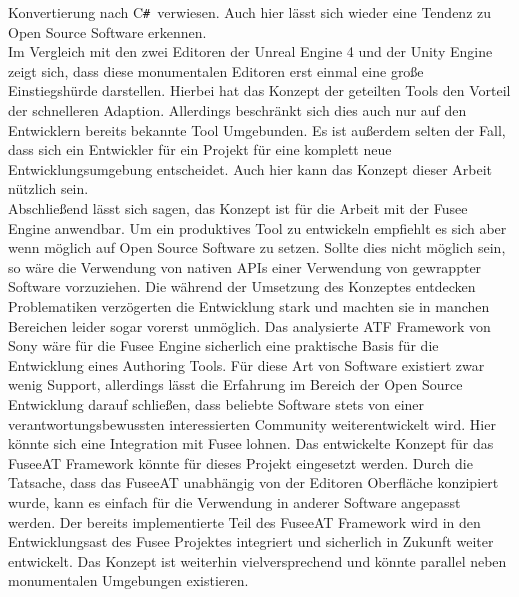 \documentclass[pagesize, paper=a4, fontsize=12pt, titlepage=true, headings=small, headnosepline, abstractoff, liststotoc, nochapterprefix, plainheadsepline, twoside]{scrreprt}
\newcommand{\CSS}{C\texttt{\# }}
\begin{document}
Konvertierung nach \CSS verwiesen. Auch hier lässt sich wieder eine Tendenz zu Open Source Software erkennen.\\

Im Vergleich mit den zwei Editoren der Unreal Engine 4 und der Unity Engine zeigt sich, dass diese monumentalen Editoren erst einmal eine große Einstiegshürde darstellen. Hierbei hat das Konzept der geteilten Tools den Vorteil der schnelleren Adaption. Allerdings beschränkt sich dies auch nur auf den Entwicklern bereits bekannte Tool Umgebunden. Es ist außerdem selten der Fall, dass sich ein Entwickler für ein Projekt für eine komplett neue Entwicklungsumgebung entscheidet. Auch hier kann das Konzept dieser Arbeit nützlich sein.\\

Abschließend lässt sich sagen, das Konzept ist für die Arbeit mit der Fusee Engine anwendbar. Um ein produktives Tool zu entwickeln empfiehlt es sich aber wenn möglich auf Open Source Software zu setzen. Sollte dies nicht möglich sein, so wäre die Verwendung von nativen APIs einer Verwendung von gewrappter Software vorzuziehen. Die während der Umsetzung des Konzeptes entdecken Problematiken verzögerten die Entwicklung stark und machten sie in manchen Bereichen leider sogar vorerst unmöglich. Das analysierte ATF Framework von Sony wäre für die Fusee Engine sicherlich eine praktische Basis für die Entwicklung eines Authoring Tools. Für diese Art von Software existiert zwar wenig Support, allerdings lässt die Erfahrung im Bereich der Open Source Entwicklung darauf schließen, dass beliebte Software stets von einer verantwortungsbewussten interessierten Community weiterentwickelt wird. Hier könnte sich eine Integration mit Fusee lohnen. Das entwickelte Konzept für das FuseeAT Framework könnte für dieses Projekt eingesetzt werden. Durch die Tatsache, dass das FuseeAT unabhängig von der Editoren Oberfläche konzipiert wurde, kann es einfach für die Verwendung in anderer Software angepasst werden. Der bereits implementierte Teil des FuseeAT Framework wird in den Entwicklungsast des Fusee Projektes integriert und sicherlich in Zukunft weiter entwickelt. Das Konzept ist weiterhin vielversprechend und könnte parallel neben monumentalen Umgebungen existieren.
\end{document}
